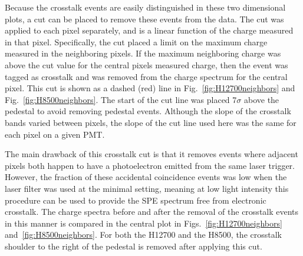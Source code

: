 Because the crosstalk events are easily distinguished in these two dimensional plots, a cut can be placed to remove these events from the data. The cut was applied to each pixel separately, and is a linear function of the charge measured in that pixel. Specifically, the cut placed a limit on the maximum charge measured in the neighboring pixels. If the maximum neighboring charge was above the cut value for the central pixel\textquotesingle s measured charge, then the event was tagged as crosstalk and was removed from the charge spectrum for the central pixel. This cut is shown as a dashed (red) line in Fig.~\ref{fig:H12700neighbors} and Fig.~\ref{fig:H8500neighbors}. The start of the cut line was placed 7$\sigma$ above the pedestal to avoid removing pedestal events. Although the slope of the crosstalk bands varied between pixels, the slope of the cut line used here was the same for each pixel on a given PMT. 

The main drawback of this crosstalk cut is that it removes events where adjacent pixels both happen to have a photoelectron emitted from the same laser trigger. However, the fraction of these accidental coincidence events was low when the laser filter was used at the minimal setting, meaning at low light intensity this procedure can be used to provide the SPE spectrum free from electronic crosstalk. The charge spectra before and after the removal of the crosstalk events in this manner is compared in the central plot in Figs.~\ref{fig:H12700neighbors} and~\ref{fig:H8500neighbors}. For both the H12700 and the H8500, the crosstalk shoulder to the right of the pedestal is removed after applying this cut. 
